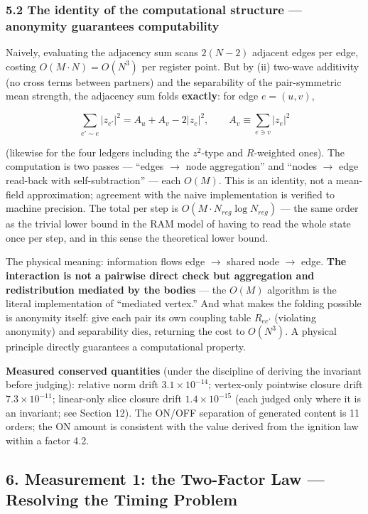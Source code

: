 \documentclass[
  a4paper,
]{article}
\begin{document}
\subsubsection{5.2 The identity of the computational structure ---
anonymity guarantees
computability}\label{the-identity-of-the-computational-structure-anonymity-guarantees-computability}

Naively, evaluating the adjacency sum scans \(2(N-2)\) adjacent edges
per edge, costing \(O(M\cdot N)=O(N^3)\) per register point. But by (ii)
two-wave additivity (no cross terms between partners) and the
separability of the pair-symmetric mean strength, the adjacency sum
folds \textbf{exactly}: for edge \(e=(u,v)\),

\[\sum_{e'\sim e} |z_{e'}|^2 = A_u + A_v - 2|z_e|^2, \qquad A_v \equiv \sum_{e\ni v}|z_e|^2\]

(likewise for the four ledgers including the \(z^2\)-type and
\(R\)-weighted ones). The computation is two passes --- ``edges \(\to\)
node aggregation'' and ``nodes \(\to\) edge read-back with
self-subtraction'' --- each \(O(M)\). This is an identity, not a
mean-field approximation; agreement with the naive implementation is
verified to machine precision. The total per step is
\(O(M\cdot N_{reg}\log N_{reg})\) --- the same order as the trivial
lower bound in the RAM model of having to read the whole state once per
step, and in this sense the theoretical lower bound.

The physical meaning: information flows edge \(\to\) shared node \(\to\)
edge. \textbf{The interaction is not a pairwise direct check but
aggregation and redistribution mediated by the bodies} --- the \(O(M)\)
algorithm is the literal implementation of ``mediated vertex.'' And what
makes the folding possible is anonymity itself: give each pair its own
coupling table \(R_{ee'}\) (violating anonymity) and separability dies,
returning the cost to \(O(N^3)\). A physical principle directly
guarantees a computational property.

\textbf{Measured conserved quantities} (under the discipline of deriving
the invariant before judging): relative norm drift
\(3.1\times10^{-14}\); vertex-only pointwise closure drift
\(7.3\times10^{-11}\); linear-only slice closure drift
\(1.4\times10^{-15}\) (each judged only where it is an invariant; see
Section 12). The ON/OFF separation of generated content is 11 orders;
the ON amount is consistent with the value derived from the ignition law
within a factor 4.2.

\subsection{6. Measurement 1: the Two-Factor Law --- Resolving the
Timing
Problem}\label{measurement-1-the-two-factor-law-resolving-the-timing-problem}
\end{document}
